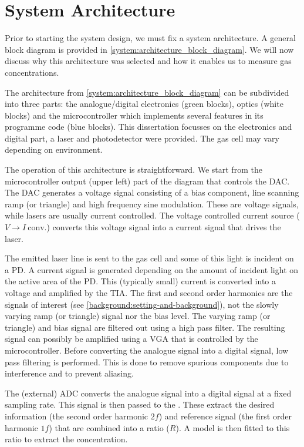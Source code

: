 \documentclass[\home/main.tex]{subfiles}
\begin{document}
\section{System Architecture}
  
  Prior to starting the system design, we must fix a system architecture. A general block diagram is provided in \cref{system:architecture_block_diagram}. We will now discuss why this architecture was selected and how it enables us to measure gas concentrations.
  
  The architecture from \cref{system:architecture_block_diagram} can be subdivided into three parts: the analogue/digital electronics (green blocks), optics (white blocks) and the microcontroller which implements several features in its programme code (blue blocks). This dissertation focusses on the electronics and digital part, a laser and photodetector were provided. The gas cell may vary depending on environment. %
  
  The operation of this architecture is straightforward. We start from the microcontroller output (upper left) part of the diagram that controls the \acrfull{DAC}. The  \acrshort{DAC} generates a voltage signal consisting of a bias component, line scanning ramp (or triangle) and high frequency sine modulation. These are voltage signals, while lasers are usually current controlled. The voltage controlled current source ($V \rightarrow I \ \text{conv.}$) converts this voltage signal into a current signal that drives the laser. 
  
  The emitted laser line is sent to the gas cell and some of this light is incident on a \acrfull{PD}. A current signal is generated depending on the amount of incident light on the active area of the \acrshort{PD}. This (typically small) current is converted into a voltage and amplified by the \acrfull{TIA}. The first and second order harmonics are the signals of interest (see \cref{background:setting-and-background}), not the slowly varying ramp (or triangle) signal nor the bias level. The varying ramp (or triangle) and bias signal are filtered out using a high pass filter. The resulting signal can possibly be amplified using a \acrfull{VGA} that is controlled by the microcontroller. Before converting the analogue signal into a digital signal, low pass filtering is performed. This is done to remove spurious components due to interference and to prevent aliasing. 
  
  The (external) \acrfull{ADC} converts the analogue signal into a digital signal at a fixed sampling rate. This signal is then passed to the . These extract the desired information (the second order harmonic $2f$) and reference signal (the first order harmonic $1f$) that are combined into a ratio ($R$). A model is then fitted to this ratio to extract the concentration.
  
\end{document}

